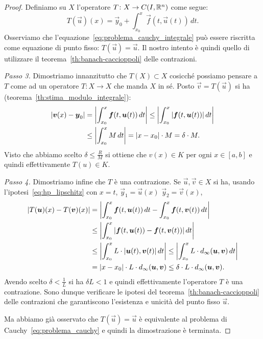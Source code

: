 \begin{proof}
  Definiamo su $X$ l'operatore $T\colon X \to C(I,{\mathbb R}^n)$ come segue:
  \[
    T(\vec u)(x) = \vec y_0 + \int_{x_0}^x \vec f(t,\vec u(t))\, dt.
  \]
  Osserviamo che l'equazione~\eqref{eq:problema_cauchy_integrale} può essere riscritta
  come equazione di punto fisso: $T(\vec u) = \vec u$. 
  Il nostro intento è quindi quello di utilizzare il teorema~\ref{th:banach-caccioppoli} delle contrazioni.

  \emph{Passo 3.}
  Dimostriamo innanzitutto che $T(X)\subset X$ cosicché possiamo pensare a $T$ come ad un operatore 
  $T\colon X\to X$ che manda $X$ in sé.
  Posto $\vec v = T(\vec u)$ si ha
  (teorema~\ref{th:stima_modulo_integrale}):
  \begin{align*}
    {\left|\boldsymbol v(x)-\boldsymbol y_0\right|} 
    &= {\left|\int_{x_0}^x \boldsymbol f(t, \boldsymbol u(t))\, dt\right|} 
    \le {\left|\int_{x_0}^x {\left|\boldsymbol f(t,\boldsymbol u(t))\right|}\, dt\right|}\\
    &\le {\left|\int_{x_0}^x M\, dt \right|} 
    = {\left|x-x_0\right|}\cdot M = \delta \cdot M.
  \end{align*}
Visto che abbiamo scelto $\delta \le \frac{R}{M}$ si ottiene che $v(x) \in K$ per ogni $x\in [a,b]$ 
e quindi effettivamente $T(u)\in K$.

\emph{Passo 4.}
Dimostriamo infine che $T$ è una contrazione. 
Se $\vec u,\vec v\in X$ si ha, usando l'ipotesi~\eqref{eq:hp_lipschitz} con $x=t$, $\vec y_1=\vec u(x)$
$\vec y_2 = \vec v(x)$,
\begin{align*}
{\left|T(\boldsymbol u)(x)-T(\boldsymbol v)(x)\right|} 
  &= {\left|\int_{x_0}^x \boldsymbol f(t,\boldsymbol u(t))\, dt - \int_{x_0}^x \boldsymbol f(t,\boldsymbol v(t))\, dt\right|} \\
  &\le {\left|\int_{x_0}^x {\left|\boldsymbol f(t,\boldsymbol u(t))- \boldsymbol f(t,\boldsymbol v(t))\right|}\, dt \right|}\\
  &\le {\left|\int_{x_0}^x L\cdot  {\left|\boldsymbol u(t), \boldsymbol v(t)\right|}\, dt\right|} 
  \le {\left|\int_{x_0}^x L \cdot d_\infty(\boldsymbol u, \boldsymbol v)\, dt\right|}  \\
  &={\left|x-x_0\right|}\cdot L \cdot d_\infty(\boldsymbol u,\boldsymbol v)
  \le \delta \cdot L \cdot d_\infty(\boldsymbol u,\boldsymbol v).
\end{align*}
Avendo scelto $\delta < \frac{1}{L}$ si ha $\delta L<1$ e quindi effettivamente l'operatore $T$ 
è una contrazione.
Sono dunque verificare le ipotesi del teorema~\ref{th:banach-caccioppoli} delle contrazioni
che garantiscono l'esistenza e unicità del punto fisso $\vec u$.

Ma abbiamo già osservato che $T(\vec u) = \vec u$ è equivalente al problema di Cauchy~\eqref{eq:problema_cauchy}
e quindi la dimostrazione è terminata.
\end{proof}

